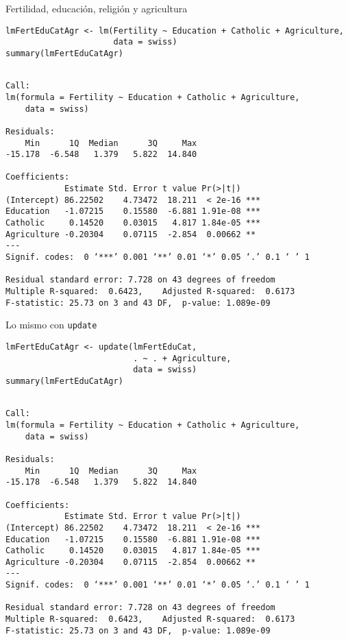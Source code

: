 \documentclass[xcolor={usenames,svgnames,dvipsnames}]{beamer}
\begin{document}
\begin{frame}[fragile,label={sec:org71c3d9e}]{Fertilidad, educación, religión y agricultura}
 \lstset{language=r,label= ,caption= ,captionpos=b,numbers=none}
\begin{lstlisting}
lmFertEduCatAgr <- lm(Fertility ~ Education + Catholic + Agriculture,
                      data = swiss)
summary(lmFertEduCatAgr)
\end{lstlisting}

\begin{verbatim}

Call:
lm(formula = Fertility ~ Education + Catholic + Agriculture, 
    data = swiss)

Residuals:
    Min      1Q  Median      3Q     Max 
-15.178  -6.548   1.379   5.822  14.840 

Coefficients:
            Estimate Std. Error t value Pr(>|t|)    
(Intercept) 86.22502    4.73472  18.211  < 2e-16 ***
Education   -1.07215    0.15580  -6.881 1.91e-08 ***
Catholic     0.14520    0.03015   4.817 1.84e-05 ***
Agriculture -0.20304    0.07115  -2.854  0.00662 ** 
---
Signif. codes:  0 ‘***’ 0.001 ‘**’ 0.01 ‘*’ 0.05 ‘.’ 0.1 ‘ ’ 1

Residual standard error: 7.728 on 43 degrees of freedom
Multiple R-squared:  0.6423,	Adjusted R-squared:  0.6173 
F-statistic: 25.73 on 3 and 43 DF,  p-value: 1.089e-09
\end{verbatim}
\end{frame}


\begin{frame}[fragile,label={sec:orgad97fb7}]{Lo mismo con \texttt{update}}
 \lstset{language=r,label= ,caption= ,captionpos=b,numbers=none}
\begin{lstlisting}
lmFertEduCatAgr <- update(lmFertEduCat,
                          . ~ . + Agriculture,
                          data = swiss)
summary(lmFertEduCatAgr)
\end{lstlisting}

\begin{verbatim}

Call:
lm(formula = Fertility ~ Education + Catholic + Agriculture, 
    data = swiss)

Residuals:
    Min      1Q  Median      3Q     Max 
-15.178  -6.548   1.379   5.822  14.840 

Coefficients:
            Estimate Std. Error t value Pr(>|t|)    
(Intercept) 86.22502    4.73472  18.211  < 2e-16 ***
Education   -1.07215    0.15580  -6.881 1.91e-08 ***
Catholic     0.14520    0.03015   4.817 1.84e-05 ***
Agriculture -0.20304    0.07115  -2.854  0.00662 ** 
---
Signif. codes:  0 ‘***’ 0.001 ‘**’ 0.01 ‘*’ 0.05 ‘.’ 0.1 ‘ ’ 1

Residual standard error: 7.728 on 43 degrees of freedom
Multiple R-squared:  0.6423,	Adjusted R-squared:  0.6173 
F-statistic: 25.73 on 3 and 43 DF,  p-value: 1.089e-09
\end{verbatim}
\end{frame}
\end{document}
